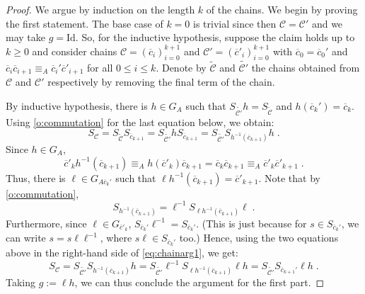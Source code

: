 \documentclass[10pt,a4paper]{amsart}
\newcommand{\nn}[0]{S}
\newcommand{\C}[0]{\mathcal{C}}
\newcommand{\orq}[0]{\equiv}
\renewcommand\leq{\leqslant}
\renewcommand\geq{\geqslant}
\theoremstyle{plain}
\theoremstyle{remark}
\begin{document}
  \begin{proof}
  {We argue by induction on the length $k$ of the chains. We begin by proving the first statement. The base case of $k=0$ is trivial since then $\C=\C'$ and we may take $g=\mathrm{Id}$. So, for the inductive hypothesis, suppose the claim holds up to $k\geq 0$ and consider chains $\C=(\overline{c}_{i})_{i=0}^{k+1}$ and $\C'=(\overline{c}'_{i})_{i=0}^{k+1}$ with $\overline{c}_{0}=\overline{c}_{0}'$ and $\overline{c}_{i}\overline{c}_{i+1}\orq_{A} \overline{c}_{i}'\overline{c}'_{i+1}$ for all $0\leq i\leq k$. Denote by $\tilde{\C}$ and $\tilde{\C'}$ the chains obtained from $\C$ and $\C'$ respectively by removing the final term of the chain.}
  
  {By inductive hypothesis, there is $h\in G_A$ such that $\nn_{\tilde{\C'}} h=\nn_{\tilde{\C}}$ and $h(\overline{c}_k')=\overline{c}_k$. Using \cref{o:commutation} for the last equation below, we obtain:}
\begin{equation}\label{eq:chainarg1}
\nn_{\C}=\nn_{\tilde{\C}}\nn_{\overline{c}_{k+1}}=\nn_{\tilde{\C'}}h\nn_{\overline{c}_{k+1}}=\nn_{\tilde{\C'}}\nn_{h^{-1}(\overline{c}_{k+1})}h\;.  
\end{equation}
Since $h\in G_A$,
\[\overline{c}'_k h^{-1}(\overline{c}_{k+1})\equiv_A h(\overline{c}'_k) \overline{c}_{k+1}=\overline{c}_k \overline{c}_{k+1}\equiv_A \overline{c}'_k \overline{c}'_{k+1}\;.\]
{Thus, there is $\ell\in G_{A \overline{c}_k'}$ such that $\ell h^{-1} (\overline{c}_{k+1})=\overline{c}'_{k+1}$. Note that by \cref{o:commutation},} 
\[\nn_{h^{-1}(\overline{c}_{k+1})}=\ell^{-1}\nn_{\ell h^{-1}(\overline{c}_{k+1})} \ell\;.\]
{Furthermore, since $\ell\in G_{\overline{c}'_k}$, $\nn_{\overline{c}_k'} \ell^{-1}=\nn_{\overline{c}_k'}$. (This is just because for $s\in \nn_{\overline{c}_k'}$, we can write $s=s\ell\ell^{-1}$, where $s\ell\in\nn_{\overline{c}_k'}$ too.) Hence, using the two equations above in the right-hand side of \eqref{eq:chainarg1}, we get:}
\[\nn_{\C}=\nn_{\tilde{\C'}}\nn_{h^{-1}(\overline{c}_{k+1})}h=\nn_{\tilde{\C'}}\ell^{-1}\nn_{\ell h^{-1}(\overline{c}_{k+1})} \ell h=\nn_{\tilde{\C'}}\nn_{\overline{c}_{k+1}'} \ell h\;.\]
  {Taking $g:=\ell h$, we can thus conclude the argument for the first part.}


\end{proof}
\end{document}
